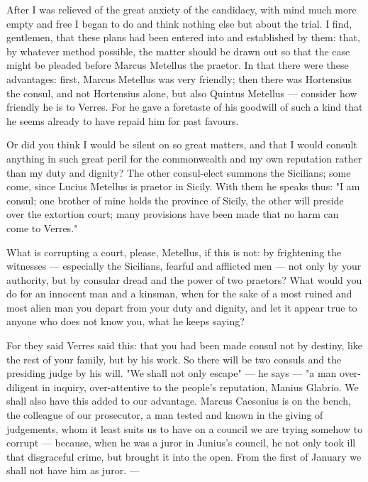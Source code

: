  After I was relieved of the great anxiety of the candidacy, with mind much more empty and free I began to do and think nothing else but about the trial. I find, gentlemen, that these plans had been entered into and established by them: that, by whatever method possible, the matter should be drawn out so that the case might be pleaded before Marcus Metellus the praetor. In that there were these advantages: first, Marcus Metellus was very friendly; then there was Hortensius the consul, and not Hortensius alone, but also Quintus Metellus --- consider how friendly he is to Verres. For he gave a foretaste of his goodwill of such a kind that he seems already to have repaid him for past favours.

 Or did you think I would be silent on so great matters, and that I would consult anything in such great peril for the commonwealth and my own reputation rather than my duty and dignity? The other consul-elect summons the Sicilians; some come, since Lucius Metellus is praetor in Sicily. With them he speaks thus: "I am consul; one brother of mine holds the province of Sicily, the other will preside over the extortion court; many provisions have been made that no harm can come to Verres."

 What is corrupting a court, please, Metellus, if this is not: by frightening the witnesses --- especially the Sicilians, fearful and afflicted men --- not only by your authority, but by consular dread and the power of two praetors? What would you do for an innocent man and a kinsman, when for the sake of a most ruined and most alien man you depart from your duty and dignity, and let it appear true to anyone who does not know you, what he keeps saying?

 For they said Verres said this: that you had been made consul not by destiny, like the rest of your family, but by his work. So there will be two consuls and the presiding judge by his will. "We shall not only escape" --- he says --- "a man over-diligent in inquiry, over-attentive to the people's reputation, Manius Glabrio. We shall also have this added to our advantage. Marcus Caesonius is on the bench, the colleague of our prosecutor, a man tested and known in the giving of judgements, whom it least suits us to have on a council we are trying somehow to corrupt --- because, when he was a juror in Junius's council, he not only took ill that disgraceful crime, but brought it into the open. From the first of January we shall not have him as juror. ---


